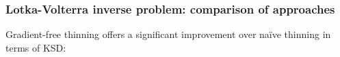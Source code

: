 \documentclass{beamer}
\begin{document}
\begin{frame}
\frametitle{Lotka-Volterra inverse problem: comparison of approaches}

Gradient-free thinning offers a significant improvement over na\"ive thinning in terms of KSD:

\begin{figure}[h]
\centering
{}
\end{figure}

\end{frame}
\end{document}
